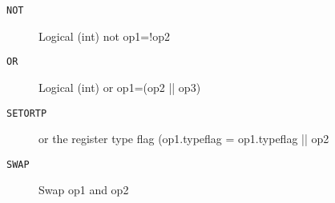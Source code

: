 \begin{description}
\item[\texttt{NOT}]  Logical (int) not op1=!op2\\

\end{description}
\begin{description}
\item[\texttt{OR}]  Logical (int) or op1=(op2 || op3)\\

\end{description}
\begin{description}
\item[\texttt{SETORTP}]  or the register type flag (op1.typeflag = op1.typeflag || op2\\

\end{description}
\begin{description}
\item[\texttt{SWAP}]  Swap op1 and op2\\

\end{description}
